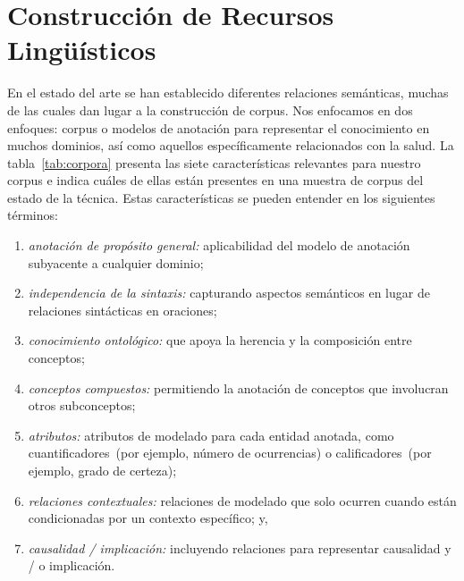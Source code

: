 \section{Construcción de Recursos Lingüísticos}

En el estado del arte se han establecido diferentes relaciones semánticas, muchas de las cuales dan lugar a la construcción de corpus. Nos enfocamos en dos enfoques: corpus o modelos de anotación para representar el conocimiento en muchos dominios, así como aquellos específicamente relacionados con la salud.
La tabla~\ref{tab:corpora} presenta las siete características relevantes para nuestro corpus e indica cuáles de ellas están presentes en una muestra de corpus del estado de la técnica.
Estas características se pueden entender en los siguientes términos:

\begin{enumerate}
  \item \textit{anotación de propósito general:} aplicabilidad del modelo de anotación subyacente a cualquier dominio;
  \item \textit{independencia de la sintaxis:} capturando aspectos semánticos en lugar de relaciones sintácticas en oraciones;
  \item \textit{conocimiento ontológico:} que apoya la herencia y la composición entre conceptos;
  \item \textit{conceptos compuestos:} permitiendo la anotación de conceptos que involucran otros subconceptos;
  \item \textit{atributos:} atributos de modelado para cada entidad anotada, como cuantificadores~(por ejemplo, número de ocurrencias) o calificadores~(por ejemplo, grado de certeza);
  \item \textit{relaciones contextuales:} relaciones de modelado que solo ocurren cuando están condicionadas por un contexto específico; y,
  \item \textit{causalidad / implicación:} incluyendo relaciones para representar causalidad y / o implicación.
\end{enumerate}

